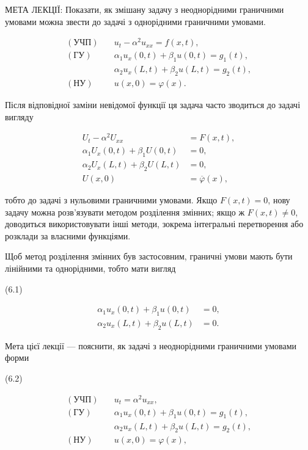\documentclass[
  ukrainian,
]{article}
\begin{document}
МЕТА ЛЕКЦІЇ: Показати, як змішану задачу з неоднорідними граничними
умовами можна звести до задачі з однорідними граничними умовами.

\[
\begin{aligned}
(\text{УЧП})\quad & u_t - \alpha^2 u_{xx} = f(x,t), \\
(\text{ГУ})\quad & \alpha_1 u_x(0,t) + \beta_1 u(0,t) = g_1(t), \\
& \alpha_2 u_x(L,t) + \beta_2 u(L,t) = g_2(t), \\
(\text{НУ})\quad & u(x,0) = \varphi(x).
\end{aligned}
\]

Після відповідної заміни невідомої функції ця задача часто зводиться до
задачі вигляду

\[
\begin{aligned}
U_t - \alpha^2 U_{xx} &= F(x,t), \\
\alpha_1 U_x(0,t) + \beta_1 U(0,t) &= 0, \\
\alpha_2 U_x(L,t) + \beta_2 U(L,t) &= 0, \\
U(x,0) &= \overline{\varphi}(x),
\end{aligned}
\]

тобто до задачі з нульовими граничними умовами. Якщо \(F(x,t)=0\), нову
задачу можна розв'язувати методом розділення змінних; якщо ж
\(F(x,t)\neq 0\), доводиться використовувати інші методи, зокрема
інтегральні перетворення або розклади за власними функціями.

Щоб метод розділення змінних був застосовним, граничні умови мають бути
лінійними та однорідними, тобто мати вигляд

(6.1)

\[
\begin{aligned}
\alpha_1 u_x(0,t) + \beta_1 u(0,t) &= 0, \\
\alpha_2 u_x(L,t) + \beta_2 u(L,t) &= 0.
\end{aligned}
\]

Мета цієї лекції --- пояснити, як задачі з неоднорідними граничними
умовами форми

(6.2)

\[
\begin{aligned}
(\text{УЧП})\quad & u_t = \alpha^2 u_{xx}, \\
(\text{ГУ})\quad & \alpha_1 u_x(0,t) + \beta_1 u(0,t) = g_1(t), \\
& \alpha_2 u_x(L,t) + \beta_2 u(L,t) = g_2(t), \\
(\text{НУ})\quad & u(x,0) = \varphi(x),
\end{aligned}
\]
\end{document}
